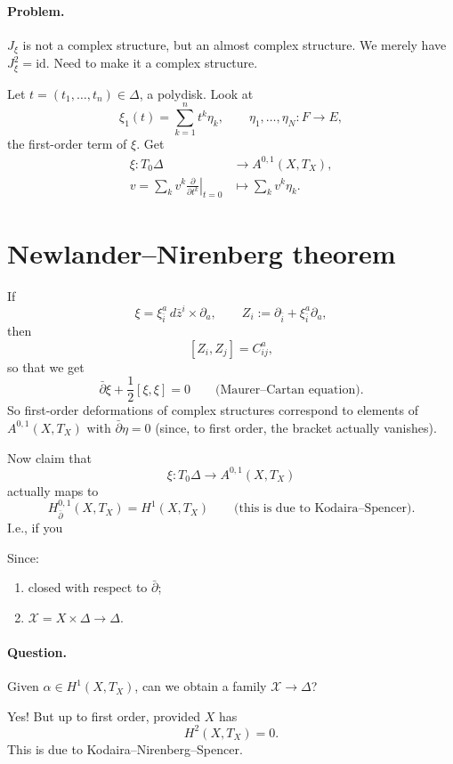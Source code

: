 \documentclass[11pt]{article}
\newcommand{\XX}{\mathcal X}
\newcommand{\id}{\mathrm{id}}
\newcommand{\bdel}{\bar\partial}
\begin{document}
\paragraph{Problem.}
$J_{\xi}$ is not a complex structure, but an almost complex structure.
We merely have $J_{\xi}^2=\id$. Need to make it a complex structure.

Let $t=(t_1,\ldots,t_n)\in\Delta$, a polydisk. Look at
\[
 \xi_1(t)=\sum_{k=1}^{n}t^k\eta_k,
 \qquad \eta_1,\ldots,\eta_N:F\longrightarrow E,
\]
the first-order term of $\xi$. Get
\[
 \begin{aligned}
 \xi:T_0\Delta&\longrightarrow A^{0,1}(X,T_X),\\
 v=\left.\sum_kv^k\frac{\partial}{\partial t^k}\right|_{t=0}
 &\longmapsto\sum_kv^k\eta_k.
 \end{aligned}
\]

\section*{Newlander--Nirenberg theorem}
If
\[
 \xi=\xi_{\bar i}^{a}\,d\bar z^{i}\times\partial_a,
 \qquad Z_i:=\partial_{\bar i}+\xi_{\bar i}^{a}\partial_a,
\]
then
\[
 [Z_i,Z_j]=C_{ij}^{a},
\]
so that we get
\[
 \bdel\xi+\frac12[\xi,\xi]=0
 \qquad\text{(Maurer--Cartan equation)}.
\]
So first-order deformations of complex structures correspond to
elements of $A^{0,1}(X,T_X)$ with $\bdel\eta=0$
(since, to first order, the bracket actually vanishes).

Now claim that
\[
 \xi:T_0\Delta\longrightarrow A^{0,1}(X,T_X)
\]
actually maps to
\[
 H^{0,1}_{\bdel}(X,T_X)=H^1(X,T_X)
 \qquad\text{(this is due to Kodaira--Spencer)}.
\]
I.e., if you

Since:
\begin{enumerate}
 \item closed with respect to $\bdel$;
 \item $\XX=X\times\Delta\longrightarrow\Delta$.
\end{enumerate}

\paragraph{Question.}
Given $\alpha\in H^1(X,T_X)$, can we obtain a family
$\XX\longrightarrow\Delta$?

Yes! But up to first order, provided $X$ has
\[
 H^2(X,T_X)=0.
\]
This is due to Kodaira--Nirenberg--Spencer.
\end{document}
